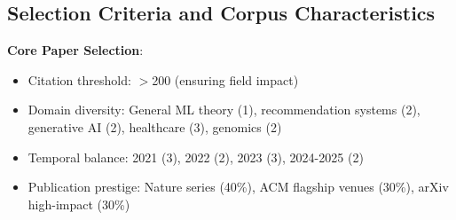 \documentclass[11pt,a4paper]{article}
\begin{document}
\subsection{Selection Criteria and Corpus Characteristics}

\textbf{Core Paper Selection}:  
\begin{itemize}
    \item Citation threshold: $>$200 (ensuring field impact)  
    \item Domain diversity: General ML theory (1), recommendation systems (2), generative AI (2), healthcare (3), genomics (2)  
    \item Temporal balance: 2021 (3), 2022 (2), 2023 (3), 2024-2025 (2)  
    \item Publication prestige: Nature series (40\%), ACM flagship venues (30\%), arXiv high-impact (30\%)
\end{itemize}
\end{document}
